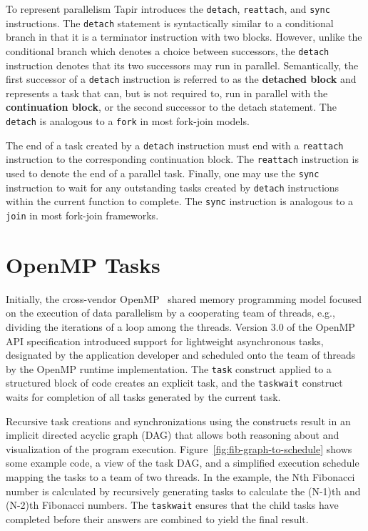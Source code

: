 \documentclass[sigconf]{acmart}
\newcommand{\figref}[1]         {Figure~\ref{fig:#1}}
\def\code{\lstinline[basicstyle=\ttfamily\color{CodeColor}]}
\begin{document}
To represent parallelism Tapir introduces the \code{detach}, \code{reattach}, and
\code{sync} instructions. The \code{detach} statement is syntactically similar to
a conditional branch in that it is a terminator instruction with two blocks.
However, unlike the conditional branch which denotes a choice between successors, the \code{detach} instruction denotes that its two successors may run in parallel. Semantically,
the first successor of a \code{detach} instruction is referred to as the \textbf{detached block} and represents a task that can, but is not required to, run in parallel with the
\textbf{continuation block}, or the second successor to the detach statement. The \code{detach}
is analogous to a \code{fork} in most fork-join models.

The end of a task created by a \code{detach} instruction must end with a \code{reattach} instruction to the corresponding continuation block. The \code{reattach} instruction
is used to denote the end of a parallel task.
%
Finally, one may use the \code{sync} instruction to wait for any outstanding tasks created
by \code{detach} instructions within the current function to complete. The \code{sync}
instruction is analogous to a \code{join} in most fork-join frameworks.


\section{OpenMP Tasks} \label{Sec:OpenMP}

Initially, the cross-vendor OpenMP~\cite{openmp} shared memory programming model
focused on the execution of data parallelism by a cooperating team of threads,
e.g., dividing the iterations of a loop among the threads. Version 3.0 of the
OpenMP API specification introduced support for lightweight asynchronous tasks,
designated by the application developer and scheduled onto the team of threads
by the OpenMP runtime implementation.  The \texttt{task} construct applied to
a structured block of code creates an explicit task, and the \texttt{taskwait}
construct waits for completion of all tasks generated by the current task.

Recursive task creations and synchronizations using the constructs result in
an implicit directed acyclic graph (DAG) that allows both reasoning about and
visualization of the program execution.  \figref{fib-graph-to-schedule}
shows some example code, a view of the task DAG, and a simplified execution
schedule mapping the tasks to a team of two threads.  In the example, the Nth
Fibonacci number is calculated by recursively generating tasks to calculate
the (N-1)th and (N-2)th Fibonacci numbers.  The \texttt{taskwait} ensures that
the child tasks have completed before their answers are combined to yield the
final result.
\end{document}
